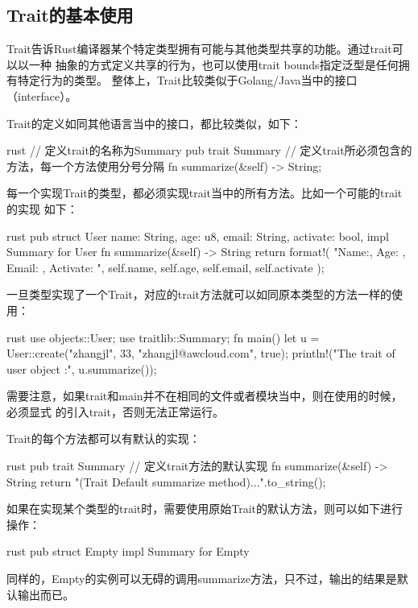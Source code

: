 \subsection{Trait的基本使用}
Trait告诉Rust编译器某个特定类型拥有可能与其他类型共享的功能。通过trait可以以一种
抽象的方式定义共享的行为，也可以使用trait bounds指定泛型是任何拥有特定行为的类型。
整体上，Trait比较类似于Golang/Java当中的接口（interface）。

Trait的定义如同其他语言当中的接口，都比较类似，如下：
\begin{code-block}{rust}
// 定义trait的名称为Summary
pub trait Summary {
    // 定义trait所必须包含的方法，每一个方法使用分号分隔
    fn summarize(&self) -> String;
}
\end{code-block}

每一个实现Trait的类型，都必须实现trait当中的所有方法。比如一个可能的trait的实现
如下：
\begin{code-block}{rust}
pub struct User {
    name: String,
    age: u8,
    email: String,
    activate: bool,
}
impl Summary for User {
    fn summarize(&self) -> String {
        return format!(
            "Name:{}, Age: {}, Email: {}, Activate: {}",
            self.name, self.age, self.email, self.activate
        );
    }
}
\end{code-block}

一旦类型实现了一个Trait，对应的trait方法就可以如同原本类型的方法一样的使用：
\begin{code-block}{rust}
use objects::User;
use traitlib::Summary;
fn main() {
    let u = User::create("zhangjl", 33, "zhangjl@awcloud.com", true);
    println!("The trait of user object :{}", u.summarize());
}
\end{code-block}
需要注意，如果trait和main并不在相同的文件或者模块当中，则在使用的时候，必须显式
的引入trait，否则无法正常运行。

Trait的每个方法都可以有默认的实现：
\begin{code-block}{rust}
pub trait Summary {
    // 定义trait方法的默认实现
    fn summarize(&self) -> String {
        return "(Trait Default summarize method)...".to_string();
    }
}
\end{code-block}

如果在实现某个类型的trait时，需要使用原始Trait的默认方法，则可以如下进行操作：
\begin{code-block}{rust}
pub struct Empty {}
impl Summary for Empty {}
\end{code-block}
同样的，Empty的实例可以无碍的调用summarize方法，只不过，输出的结果是默认输出而已。

